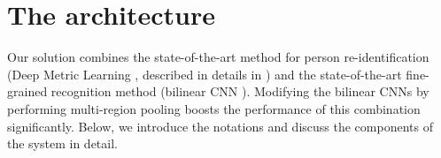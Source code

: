 \section{The architecture}

Our solution combines the state-of-the-art method for person re-identification (Deep Metric Learning  \citep{yi2014deep}, described in details in ) and the state-of-the-art fine-grained recognition method (bilinear CNN \citep{lin2015bilinear}). Modifying the bilinear CNNs by performing multi-region pooling boosts the performance of this combination significantly. Below, we introduce the notations and discuss the components of the system in detail.







